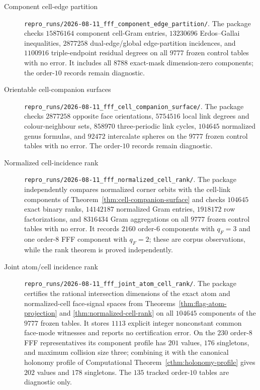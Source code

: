 \begin{description}
\item[Component cell-edge partition]
\nolinkurl{repro_runs/2026-08-11_fff_component_edge_partition/}.
The package checks $15876164$ component cell-Gram entries, $13230696$
Erdos--Gallai inequalities, $2877258$ dual-edge/global edge-partition
incidences, and $1100916$ triple-endpoint residual degrees on all $9777$
frozen control
tables with no error.  It includes all $8788$ exact-mask dimension-zero
components; the order-$10$ records remain diagnostic.

\item[Orientable cell-companion surfaces]
\nolinkurl{repro_runs/2026-08-11_fff_cell_companion_surface/}.
The package checks $2877258$ opposite face orientations, $5754516$ local
link degrees and colour-neighbour sets, $858970$ three-periodic link cycles,
$104645$ normalized genus formulas, and $92472$ intercalate spheres on the
$9777$ frozen control tables with no error.  The order-$10$ records remain
diagnostic.

\item[Normalized cell-incidence rank]
\nolinkurl{repro_runs/2026-08-11_fff_normalized_cell_rank/}.
The package independently compares normalized corner orbits with the
cell-link components of Theorem~\ref{thm:cell-companion-surface} and checks
$104645$ exact binary ranks, $14142187$
normalized Gram entries, $1918172$ row factorizations, and $8316434$ Gram
aggregations on all $9777$ frozen control tables with no error.  It records
$2160$ order-$6$ components with $q_F=3$ and one order-$8$ FFF component with
$q_F=2$; these are corpus observations, while the rank theorem is proved
independently.

\item[Joint atom/cell incidence rank]
\nolinkurl{repro_runs/2026-08-11_fff_joint_atom_cell_rank/}.
The package certifies the rational intersection dimensions of the exact atom
and normalized-cell face-signal spaces from
Theorems~\ref{thm:flag-atom-projection} and
\ref{thm:normalized-cell-rank} on all $104645$ components of the
$9777$ frozen tables.  It stores $1113$ explicit integer nonconstant common
face-mode witnesses and reports no certification error.  On the $230$
order-$8$ FFF representatives its component profile has $201$ values, $176$
singletons, and maximum collision size three; combining it with the canonical
holonomy profile of Computational Theorem~\ref{cthm:holonomy-profile} gives
$202$ values and $178$ singletons.  The $135$ tracked order-$10$ tables are
diagnostic only.


\end{description}
